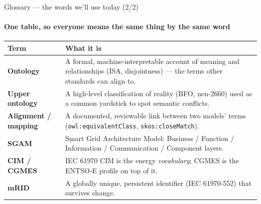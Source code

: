 \begin{frame}{Glossary — the words we'll use today (2/2)}
  \framesubtitle{One table, so everyone means the same thing by the same word}
  \scriptsize
  \setlength{\tabcolsep}{4pt}
  \renewcommand{\arraystretch}{1.15}
  \begin{center}
  \begin{tabular}{@{}p{3.3cm}p{11.5cm}@{}}
    \toprule
    \textbf{Term} & \textbf{What it is}\\
    \midrule
    \textbf{Ontology} & A formal, machine-interpretable account of meaning and relationships (ISA, disjointness) --- the terms other standards can align to.\\
    \textbf{Upper ontology} & A high-level classification of reality (BFO, nen-2660) used as a common yardstick to spot semantic conflicts.\\
    \textbf{Alignment / mapping} & A documented, reviewable link between two models' terms (\texttt{owl:equivalentClass}, \texttt{skos:closeMatch}).\\
    \textbf{SGAM} & Smart Grid Architecture Model: Business / Function / Information / Communication / Component layers.\\
    \textbf{CIM / CGMES} & IEC 61970 CIM is the energy \emph{vocabulary}; CGMES is the ENTSO-E profile on top of it.\\
    \textbf{mRID} & A globally unique, persistent identifier (IEC 61970-552) that survives change.\\
    \bottomrule
  \end{tabular}
  \end{center}
\end{frame}
